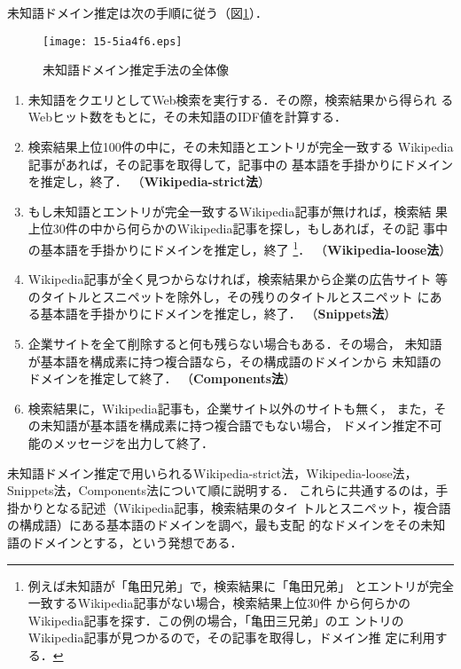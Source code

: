 \documentclass[japanese]{jnlp_1.4}
\begin{document}
未知語ドメイン推定は次の手順に従う（図\ref{unknown-domest-pic}）．

\begin{figure}[b]
\begin{center}
\texttt{[image: 15-5ia4f6.eps]}
\end{center}
\caption{未知語ドメイン推定手法の全体像}
\label{unknown-domest-pic}
\end{figure}

\begin{enumerate}
 \item 未知語をクエリとしてWeb検索を実行する．その際，検索結果から得られ
       るWebヒット数をもとに，その未知語のIDF値を計算する．
 \item 検索結果上位100件の中に，その未知語とエントリが完全一致する
       Wikipedia記事があれば，その記事を取得して，記事中の
       基本語を手掛かりにドメインを推定し，終了．
     （\textbf{Wikipedia-strict法}）
 \item もし未知語とエントリが完全一致するWikipedia記事が無ければ，検索結
       果上位30件の中から何らかのWikipedia記事を探し，もしあれば，その記
       事中の基本語を手掛かりにドメインを推定し，終了
       \footnote{例えば未知語が「亀田兄弟」で，検索結果に「亀田兄弟」
       とエントリが完全一致するWikipedia記事がない場合，検索結果上位30件
       から何らかのWikipedia記事を探す．この例の場合，「亀田三兄弟」のエ
       ントリのWikipedia記事が見つかるので，その記事を取得し，ドメイン推
       定に利用する．}．
     （\textbf{Wikipedia-loose法}）
 \item Wikipedia記事が全く見つからなければ，検索結果から企業の広告サイト
       等のタイトルとスニペットを除外し，その残りのタイトルとスニペット
       にある基本語を手掛かりにドメインを推定し，終了．
       （\textbf{Snippets法}）
 \item 企業サイトを全て削除すると何も残らない場合もある．その場合，
       未知語が基本語を構成素に持つ複合語なら，その構成語のドメインから
       未知語のドメインを推定して終了．
       （\textbf{Components法}）
 \item 検索結果に，Wikipedia記事も，企業サイト以外のサイトも無く，
       また，その未知語が基本語を構成素に持つ複合語でもない場合，
       ドメイン推定不可能のメッセージを出力して終了．
\end{enumerate}

未知語ドメイン推定で用いられるWikipedia-strict法，Wikipedia-loose法，
Snippets法，Components法について順に説明する．
これらに共通するのは，手掛かりとなる記述（Wikipedia記事，検索結果のタイ
トルとスニペット，複合語の構成語）にある基本語のドメインを調べ，最も支配
的なドメインをその未知語のドメインとする，という発想である．
\end{document}
